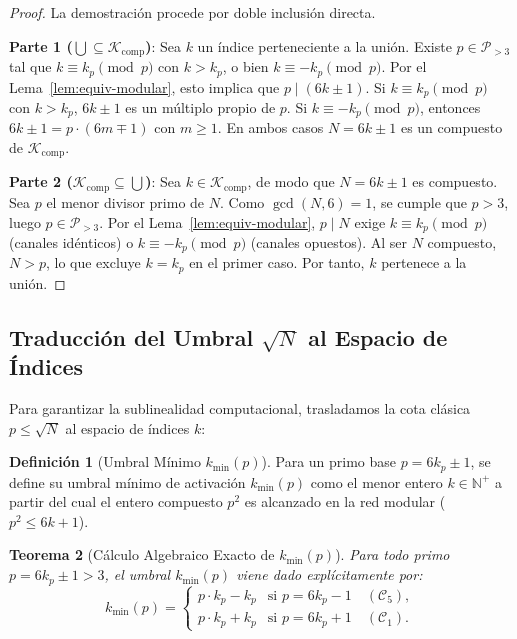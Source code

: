 \documentclass{article}
\numberwithin{equation}{section}
\theoremstyle{plain}
\newtheorem{theorem}{Teorema}[section]
\theoremstyle{definition}
\newtheorem{definition}[theorem]{Definición}
\begin{document}
\begin{proof}
La demostración procede por doble inclusión directa.

\noindent\textbf{Parte 1 ($\bigcup \subseteq \mathcal{K}_{\text{comp}}$)}: Sea $k$ un índice perteneciente a la unión. Existe $p \in \mathcal{P}_{>3}$ tal que $k \equiv k_p \pmod p$ con $k > k_p$, o bien $k \equiv -k_p \pmod p$. Por el Lema~\ref{lem:equiv-modular}, esto implica que $p \mid (6k \pm 1)$. Si $k \equiv k_p \pmod p$ con $k > k_p$, $6k \pm 1$ es un múltiplo propio de $p$. Si $k \equiv -k_p \pmod p$, entonces $6k \pm 1 = p \cdot (6m \mp 1)$ con $m \ge 1$. En ambos casos $N = 6k \pm 1$ es un compuesto de $\mathcal{K}_{\text{comp}}$.

\noindent\textbf{Parte 2 ($\mathcal{K}_{\text{comp}} \subseteq \bigcup$)}: Sea $k \in \mathcal{K}_{\text{comp}}$, de modo que $N = 6k \pm 1$ es compuesto. Sea $p$ el menor divisor primo de $N$. Como $\gcd(N, 6) = 1$, se cumple que $p > 3$, luego $p \in \mathcal{P}_{>3}$. Por el Lema~\ref{lem:equiv-modular}, $p \mid N$ exige $k \equiv k_p \pmod p$ (canales idénticos) o $k \equiv -k_p \pmod p$ (canales opuestos). Al ser $N$ compuesto, $N > p$, lo que excluye $k = k_p$ en el primer caso. Por tanto, $k$ pertenece a la unión.
\end{proof}

\subsection{Traducción del Umbral $\sqrt{N}$ al Espacio de Índices}

Para garantizar la sublinealidad computacional, trasladamos la cota clásica $p \le \sqrt{N}$ al espacio de índices $k$:

\begin{definition}[Umbral Mínimo $k_{\min}(p)$]
\label{def:umin}
Para un primo base $p = 6k_p \pm 1$, se define su umbral mínimo de activación $k_{\min}(p)$ como el menor entero $k \in \mathbb{N}^+$ a partir del cual el entero compuesto $p^2$ es alcanzado en la red modular ($p^2 \le 6k + 1$).
\end{definition}

\begin{theorem}[Cálculo Algebraico Exacto de $k_{\min}(p)$]
\label{thm:calculo-kmin}
Para todo primo $p = 6k_p \pm 1 > 3$, el umbral $k_{\min}(p)$ viene dado explícitamente por:
\begin{equation}
k_{\min}(p) = 
\begin{cases}
p \cdot k_p - k_p & \text{si } p = 6k_p - 1 \quad (\mathcal{C}_5), \\
p \cdot k_p + k_p & \text{si } p = 6k_p + 1 \quad (\mathcal{C}_1).
\end{cases}
\end{equation}
\end{theorem}
\end{document}
